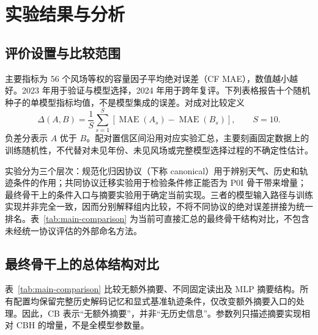 \section{实验结果与分析}
\label{sec:results}

\subsection{评价设置与比较范围}

主要指标为 56 个风场等权的容量因子平均绝对误差（CF MAE），数值越小越好。2023 年用于验证与模型选择，2024 年用于跨年复评。下列表格报告十个随机种子的单模型指标均值，不是模型集成的误差。对成对比较定义
\begin{equation}
 \Delta(A,B)=\frac{1}{S}\sum_{s=1}^{S}
 \left[\operatorname{MAE}(A_s)-\operatorname{MAE}(B_s)\right],\qquad S=10.
\end{equation}
负差分表示 $A$ 优于 $B$。配对置信区间沿用对应实验汇总，主要刻画固定数据上的训练随机性，不代替对未见年份、未见风场或完整模型选择过程的不确定性估计。

实验分为三个层次：规范化归因协议（下称 canonical）用于辨别天气、历史和轨迹条件的作用；共同协议迁移实验用于检验条件修正能否为 P0I 骨干带来增量；最终骨干上的条件入口与摘要实验用于确定当前实现。三者的模型输入路径与训练实现并非完全一致，因而分别解释组内比较，不将不同协议的绝对误差拼接为统一排名。表~\ref{tab:main-comparison} 为当前可直接汇总的最终骨干结构对比，不包含未经统一协议评估的外部命名方法。

\subsection{最终骨干上的总体结构对比}

表~\ref{tab:main-comparison} 比较无额外摘要、不同固定读出及 MLP 摘要结构。所有配置均保留完整历史解码记忆和显式基准轨迹条件，仅改变额外摘要入口的处理。因此，CB 表示“无额外摘要”，并非“无历史信息”。参数列只描述摘要实现相对 CBH 的增量，不是全模型参数量。

